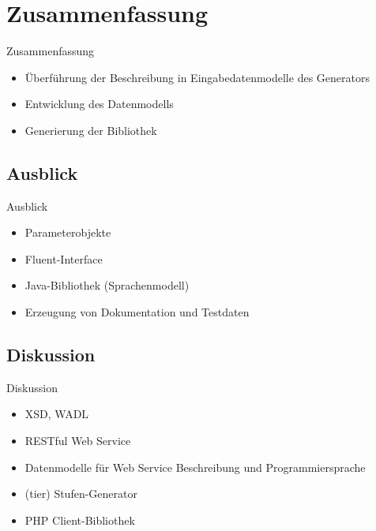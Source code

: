 \section{Zusammenfassung}

\begin{frame}{Zusammenfassung}
    \begin{itemize}
    	\item Überführung der Beschreibung in Eingabedatenmodelle des Generators
    	\item Entwicklung des Datenmodells
    	\item Generierung der Bibliothek
    \end{itemize}
\end{frame}

\subsection{Ausblick}
\begin{frame}{Ausblick}
	\begin{itemize}
		\item Parameterobjekte
		\item Fluent-Interface
		\item Java-Bibliothek (Sprachenmodell)
		\item Erzeugung von Dokumentation und Testdaten
	\end{itemize}
\end{frame}

\subsection{Diskussion}
\begin{frame}{Diskussion}
	\begin{itemize}
		\item XSD, WADL
		\item RESTful Web Service
        \item Datenmodelle für Web Service Beschreibung und Programmiersprache
        \item (tier) Stufen-Generator   
		\item PHP Client-Bibliothek
	\end{itemize}
\end{frame}